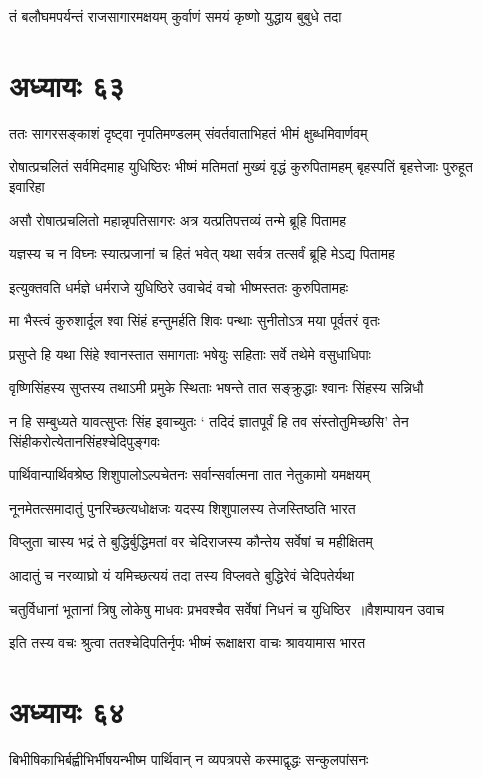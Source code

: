 \twolineshloka
{तं बलौघमपर्यन्तं राजसागारमक्षयम्}
{कुर्वाणं समयं कृष्णो युद्धाय बुबुधे तदा}


\chapter{अध्यायः ६३}
\threelineshloka
{ततः सागरसङ्काशं दृष्ट्वा नृपतिमण्डलम्}
{संवर्तवाताभिहतं भीमं क्षुब्धमिवार्णवम्}
{}


\fourlineindentedshloka
{रोषात्प्रचलितं सर्वमिदमाह युधिष्ठिरः}
{भीष्मं मतिमतां मुख्यं वृद्धं कुरुपितामहम्}
{बृहस्पतिं बृहत्तेजाः पुरुहूत इवारिहा}
{}


\twolineshloka
{असौ रोषात्प्रचलितो महान्नृपतिसागरः}
{अत्र यत्प्रतिपत्तव्यं तन्मे ब्रूहि पितामह}


\twolineshloka
{यज्ञस्य च न विघ्नः स्यात्प्रजानां च हितं भवेत्}
{यथा सर्वत्र तत्सर्वं ब्रूहि मेऽद्य पितामह}


\twolineshloka
{इत्युक्तवति धर्मज्ञे धर्मराजे युधिष्ठिरे}
{उवाचेदं वचो भीष्मस्ततः कुरुपितामहः}


\twolineshloka
{मा भैस्त्वं कुरुशार्दूल श्वा सिंहं हन्तुमर्हति}
{शिवः पन्थाः सुनीतोऽत्र मया पूर्वतरं वृतः}


\twolineshloka
{प्रसुप्ते हि यथा सिंहे श्वानस्तात समागताः}
{भषेयुः सहिताः सर्वे तथेमे वसुधाधिपाः}


\twolineshloka
{वृष्णिसिंहस्य सुप्तस्य तथाऽमी प्रमुके स्थिताः}
{भषन्ते तात सङ्क्रुद्धाः श्वानः सिंहस्य सन्निधौ}


\threelineshloka
{न हि सम्बुध्यते यावत्सुप्तः सिंह इवाच्युतः}
{` तदिदं ज्ञातपूर्वं हि तव संस्तोतुमिच्छसि'}
{तेन सिंहीकरोत्येतानसिंहश्चेदिपुङ्गवः}


\twolineshloka
{पार्थिवान्पार्थिवश्रेष्ठ शिशुपालोऽल्पचेतनः}
{सर्वान्सर्वात्मना तात नेतुकामो यमक्षयम्}


\twolineshloka
{नूनमेतत्समादातुं पुनरिच्छत्यधोक्षजः}
{यदस्य शिशुपालस्य तेजस्तिष्ठति भारत}


\twolineshloka
{विप्लुता चास्य भद्रं ते बुद्धिर्बुद्धिमतां वर}
{चेदिराजस्य कौन्तेय सर्वेषां च महीक्षितम्}


\twolineshloka
{आदातुं च नरव्याघ्रो यं यमिच्छत्ययं तदा}
{तस्य विप्लवते बुद्धिरेवं चेदिपतेर्यथा}


\threelineshloka
{चतुर्विधानां भूतानां त्रिषु लोकेषु माधवः}
{प्रभवश्चैव सर्वेषां निधनं च युधिष्ठिर ॥वैशम्पायन उवाच}
{}


\twolineshloka
{इति तस्य वचः श्रुत्वा ततश्चेदिपतिर्नृपः}
{भीष्मं रूक्षाक्षरा वाचः श्रावयामास भारत}


\chapter{अध्यायः ६४}
\twolineshloka
{बिभीषिकाभिर्बह्वीभिर्भीषयन्भीष्म पार्थिवान्}
{न व्यपत्रपसे कस्माद्वृद्धः सन्कुलपांसनः}


